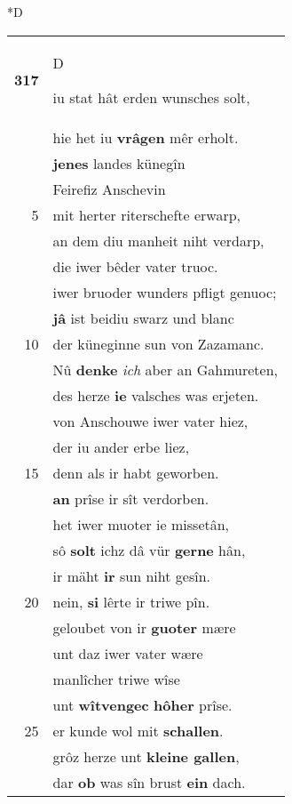 \documentclass[8pt,a4paper,notitlepage]{article}
\begin{document}
\begin{table}[ht]
\begin{minipage}[t]{0.5\linewidth}
\small
\begin{center}*D
\end{center}
\begin{tabular}{rl}
\textbf{317} & \begin{large}D\end{large}iu stat hât erden wunsches solt,\\ 
 & hie het iu \textbf{vrâgen} mêr erholt.\\ 
 & \textbf{jenes} landes künegîn\\ 
 & Feirefiz Anschevin\\ 
5 & mit herter riterschefte erwarp,\\ 
 & an dem diu manheit niht verdarp,\\ 
 & die iwer bêder vater truoc.\\ 
 & iwer bruoder wunders pfligt genuoc;\\ 
 & \textbf{jâ} ist beidiu swarz und blanc\\ 
10 & der küneginne sun von Zazamanc.\\ 
 & Nû \textbf{denke} \textit{ich} aber an Gahmureten,\\ 
 & des herze \textbf{ie} valsches was erjeten.\\ 
 & von Anschouwe iwer vater hiez,\\ 
 & der iu ander erbe liez,\\ 
15 & denn als ir habt geworben.\\ 
 & \textbf{an} prîse ir sît verdorben.\\ 
 & het iwer muoter ie missetân,\\ 
 & sô \textbf{solt} ichz dâ vür \textbf{gerne} hân,\\ 
 & ir mäht \textbf{ir} sun niht gesîn.\\ 
20 & nein, \textbf{si} lêrte ir triwe pîn.\\ 
 & geloubet von ir \textbf{guoter} mære\\ 
 & unt daz iwer vater wære\\ 
 & manlîcher triwe wîse\\ 
 & unt \textbf{wîtvengec} \textbf{hôher} prîse.\\ 
25 & er kunde wol mit \textbf{schallen}.\\ 
 & grôz herze unt \textbf{kleine gallen},\\ 
 & dar \textbf{ob} was sîn brust \textbf{ein} dach.\\ 

\end{tabular}
\end{minipage}
\end{table}
\end{document}
